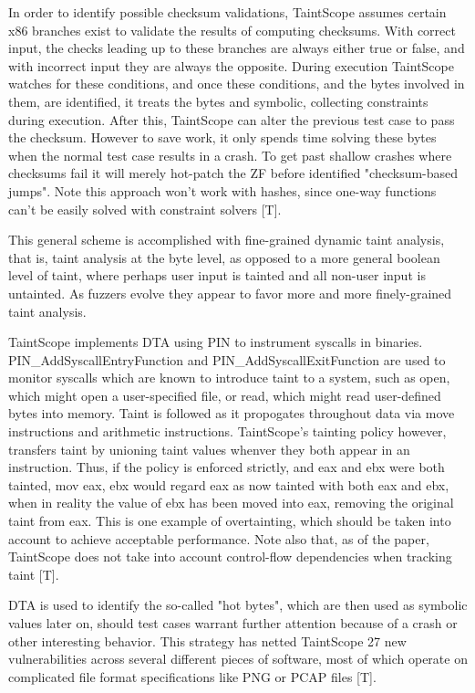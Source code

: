 \documentclass[11pt,expanded,copyright]{fsuthesis}
\begin{document}
In order to identify possible checksum validations, TaintScope assumes certain x86 branches exist to validate the results of computing checksums. With correct input, the checks leading up to these branches are always either true or false, and with incorrect input they are always the opposite. During execution TaintScope watches for these conditions, and once these conditions, and the bytes involved in them, are identified, it treats the bytes and symbolic, collecting constraints during execution. After this, TaintScope can alter the previous test case to pass the checksum. However to save work, it only spends time solving these bytes when the normal test case results in a crash. To get past shallow crashes where checksums fail it will merely hot-patch the ZF before identified "checksum-based jumps". Note this approach won't work with hashes, since one-way functions can't be easily solved with constraint solvers [T].

This general scheme is accomplished with fine-grained dynamic taint analysis, that is, taint analysis at the byte level, as opposed to a more general boolean level of taint, where perhaps user input is tainted and all non-user input is untainted. As fuzzers evolve they appear to favor more and more finely-grained taint analysis.

TaintScope implements DTA using PIN to instrument syscalls in binaries. PIN\_AddSyscallEntryFunction and PIN\_AddSyscallExitFunction are used to monitor syscalls which are known to introduce taint to a system, such as open, which might open a user-specified file, or read, which might read user-defined bytes into memory. Taint is followed as it propogates throughout data via move instructions and arithmetic instructions. TaintScope's tainting policy however, transfers taint by unioning taint values whenver they both appear in an instruction. Thus, if the policy is enforced strictly, and eax and ebx were both tainted, mov eax, ebx would regard eax as now tainted with both eax and ebx, when in reality the value of ebx has been moved into eax, removing the original taint from eax. This is one example of overtainting, which should be taken into account to achieve acceptable performance. Note also that, as of the paper, TaintScope does not take into account control-flow dependencies when tracking taint [T].

DTA is used to identify the so-called "hot bytes", which are then used as symbolic values later on, should test cases warrant further attention because of a crash or other interesting behavior. This strategy has netted TaintScope 27 new vulnerabilities across several different pieces of software, most of which operate on complicated file format specifications like PNG or PCAP files [T].
\end{document}
